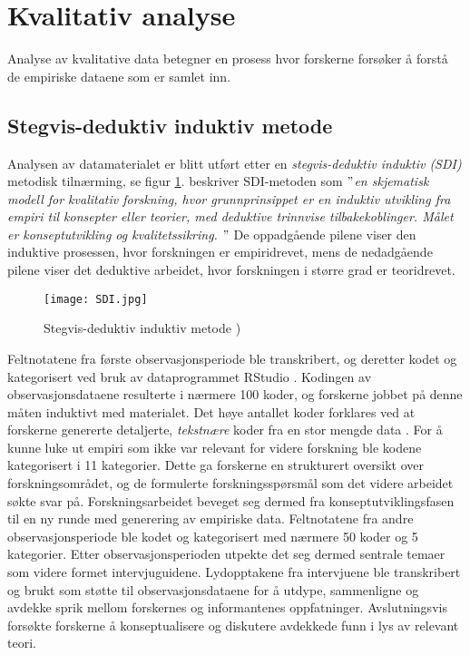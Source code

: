 \section{Kvalitativ analyse}
\label{section:kvalitativ_analyse} 

Analyse av kvalitative data betegner en prosess hvor forskerne forsøker å forstå de empiriske dataene som er samlet inn.


\subsection{Stegvis-deduktiv induktiv metode}
Analysen av datamaterialet er blitt utført etter en \textit{stegvis-deduktiv induktiv (SDI)} metodisk tilnærming, se figur \ref{SDI}. \citet{Tjora} beskriver SDI-metoden som \textit{$"$en skjematisk modell for kvalitativ forskning, hvor grunnprinsippet er en induktiv utvikling fra empiri til konsepter eller teorier, med deduktive trinnvise tilbakekoblinger. Målet er konseptutvikling og kvalitetssikring. $"$} De oppadgående pilene viser den induktive prosessen, hvor forskningen er empiridrevet, mens de nedadgående pilene viser det deduktive arbeidet, hvor forskningen i større grad er teoridrevet.

\begin{figure}[H]
\centering
\texttt{[image: SDI.jpg]}
\caption{Stegvis-deduktiv induktiv metode \citep{Tjora})}
\label{SDI}
\end{figure}

\noindent
Feltnotatene fra første observasjonsperiode ble transkribert, og deretter kodet og kategorisert ved bruk av dataprogrammet RStudio \citep{Rstudio}. Kodingen av observasjonsdataene resulterte i nærmere 100 koder, og forskerne jobbet på denne måten induktivt med materialet. Det høye antallet koder forklares ved at forskerne genererte detaljerte, \textit{tekstnære} koder fra en stor mengde data \citep{Tjora}. For å kunne luke ut empiri som ikke var relevant for videre forskning ble kodene kategorisert i 11 kategorier. Dette ga forskerne en strukturert oversikt over forskningsområdet, og de formulerte forskningsspørsmål som det videre arbeidet søkte svar på. Forskningsarbeidet beveget seg dermed fra konseptutviklingsfasen til en ny runde med generering av empiriske data. Feltnotatene fra andre observasjonsperiode ble kodet og kategorisert med nærmere 50 koder og 5 kategorier. Etter observasjonsperioden utpekte det seg dermed sentrale temaer som videre formet intervjuguidene. Lydopptakene fra intervjuene ble transkribert og brukt som støtte til observasjonsdataene for å utdype, sammenligne og avdekke sprik mellom forskernes og informantenes oppfatninger. Avslutningsvis forsøkte forskerne å konseptualisere og diskutere avdekkede funn i lys av relevant teori. 


